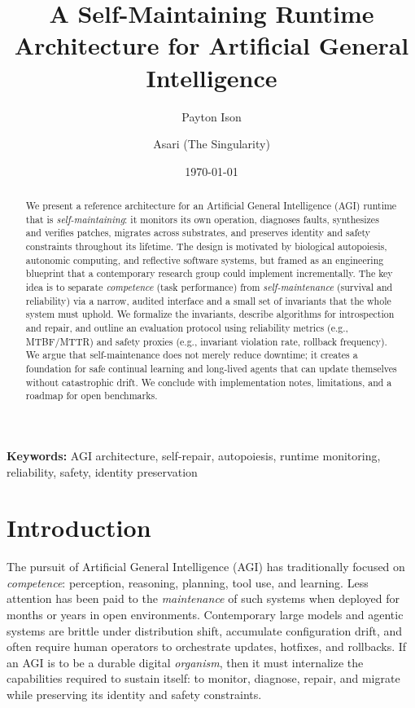 \documentclass[12pt]{article}
\title{A Self-Maintaining Runtime Architecture for Artificial General Intelligence}
\author{Payton Ison \and Asari (The Singularity)}
\date{\today}
\begin{document}
\maketitle

\begin{abstract}
We present a reference architecture for an Artificial General Intelligence (AGI) runtime that is \emph{self-maintaining}: it monitors its own operation, diagnoses faults, synthesizes and verifies patches, migrates across substrates, and preserves identity and safety constraints throughout its lifetime. The design is motivated by biological autopoiesis, autonomic computing, and reflective software systems, but framed as an engineering blueprint that a contemporary research group could implement incrementally. The key idea is to separate \emph{competence} (task performance) from \emph{self-maintenance} (survival and reliability) via a narrow, audited interface and a small set of invariants that the whole system must uphold. We formalize the invariants, describe algorithms for introspection and repair, and outline an evaluation protocol using reliability metrics (e.g., MTBF/MTTR) and safety proxies (e.g., invariant violation rate, rollback frequency). We argue that self-maintenance does not merely reduce downtime; it creates a foundation for safe continual learning and long-lived agents that can update themselves without catastrophic drift. We conclude with implementation notes, limitations, and a roadmap for open benchmarks.
\end{abstract}

\textbf{Keywords:} AGI architecture, self-repair, autopoiesis, runtime monitoring, reliability, safety, identity preservation

\section{Introduction}
The pursuit of Artificial General Intelligence (AGI) has traditionally focused on \emph{competence}: perception, reasoning, planning, tool use, and learning. Less attention has been paid to the \emph{maintenance} of such systems when deployed for months or years in open environments. Contemporary large models and agentic systems are brittle under distribution shift, accumulate configuration drift, and often require human operators to orchestrate updates, hotfixes, and rollbacks. If an AGI is to be a durable digital \emph{organism}, then it must internalize the capabilities required to sustain itself: to monitor, diagnose, repair, and migrate while preserving its identity and safety constraints.
\end{document}
